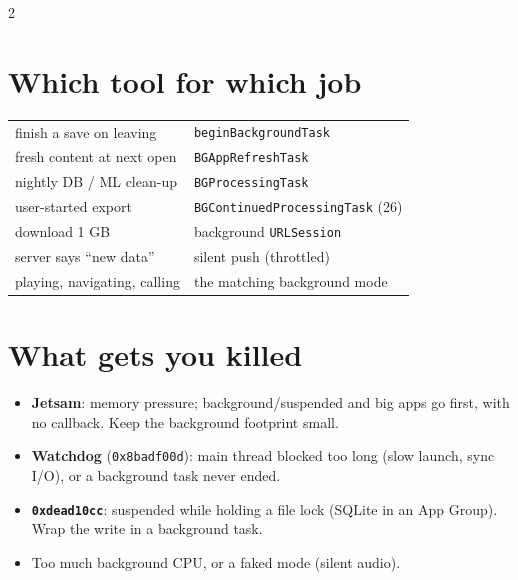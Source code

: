 \documentclass[8pt]{extarticle}
\begin{document}
\begin{multicols}{2}
\section{Which tool for which job}
{\footnotesize
\begin{tabular}{@{}l l@{}}
\toprule
finish a save on leaving & \texttt{beginBackgroundTask} \\
fresh content at next open & \texttt{BGAppRefreshTask} \\
nightly DB / ML clean-up & \texttt{BGProcessingTask} \\
user-started export & \texttt{BGContinuedProcessingTask} (26) \\
download 1 GB & background \texttt{URLSession} \\
server says ``new data'' & silent push (throttled) \\
playing, navigating, calling & the matching background mode \\
\bottomrule
\end{tabular}}

\columnbreak

\section{What gets you killed}
\begin{itemize}
  \item \textbf{Jetsam}: memory pressure; background/suspended and big apps go
        first, with no callback. Keep the background footprint small.
  \item \textbf{Watchdog} (\texttt{0x8badf00d}): main thread blocked too long
        (slow launch, sync I/O), or a background task never ended.
  \item \textbf{\texttt{0xdead10cc}}: suspended while holding a file lock
        (SQLite in an App Group). Wrap the write in a background task.
  \item Too much background CPU, or a faked mode (silent audio).
\end{itemize}


\end{multicols}
\end{document}
